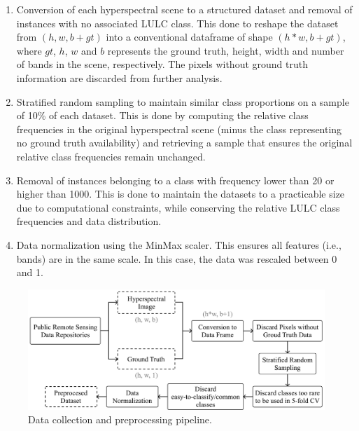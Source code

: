 \documentclass[authoryear,preprint,12pt]{elsarticle}
\begin{document}
\begin{linenumbers}
\begin{enumerate}
    \item Conversion of each hyperspectral scene to a structured
        dataset and removal of instances with no associated LULC class. This
        done to reshape the dataset from $(h,w,b+gt)$  into a conventional
        dataframe of shape $(h*w,b+gt)$, where $gt$, $h$, $w$ and $b$
        represents the ground truth, height, width and number of bands in the
        scene, respectively. The pixels without ground truth information are
        discarded from further analysis.

    \item Stratified random sampling to maintain similar class
        proportions on a sample of 10\% of each dataset. This is done by
        computing the relative class frequencies in the original hyperspectral
        scene (minus the class representing no ground truth availability) and
        retrieving a sample that ensures the original relative class
        frequencies remain unchanged.

    \item Removal of instances belonging to a class with frequency
        lower than 20 or higher than 1000. This is done to maintain the
        datasets to a practicable size due to computational constraints, while
        conserving the relative LULC class frequencies and data distribution. 

    \item Data normalization using the MinMax scaler. This ensures all
        features (i.e., bands) are in the same scale. In this case, the data
        was rescaled between 0 and 1.

\end{enumerate}

\begin{figure}
	\centering
    \captionsetup{justification=centering}
    \caption{Data collection and preprocessing pipeline.
    \vspace{.2cm}}
	\label{fig:data_preprocessing_pipeline}
	\includegraphics[width=\linewidth]{../analysis/data_preprocessing_pipeline}
\end{figure}


\end{linenumbers}
\end{document}
